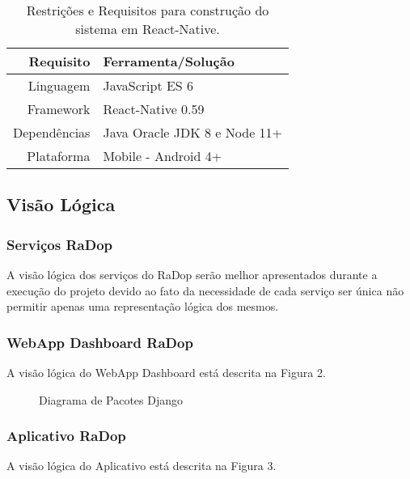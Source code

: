 \begin{table}[h]
\centering
  \begin{tabular}{|r|l|}
  \hline
  \textbf{Requisito} & \textbf{Ferramenta/Solução}  \\ \hline
  Linguagem          & JavaScript ES 6              \\ \hline
  Framework          & React-Native 0.59            \\ \hline
  Dependências       & Java Oracle JDK 8 e Node 11+ \\ \hline
  Plataforma         & Mobile - Android 4+          \\ \hline
  \end{tabular}
  \caption{Restrições e Requisitos para construção do sistema em React-Native.}
\end{table}

\subsection{Visão Lógica}\label{visao-logica}

\subsubsection{Serviços RaDop}\label{servicos-radop}

A visão lógica dos serviços do RaDop serão melhor apresentados durante a
execução do projeto devido ao fato da necessidade de cada serviço ser
única não permitir apenas uma representação lógica dos mesmos.

\subsubsection{WebApp Dashboard RaDop}\label{visao-webapp-dashboard-radop}

A visão lógica do WebApp Dashboard está descrita na Figura 2.

\begin{figure}[!htb]
    \caption{\label{fig:diagrama-pact-django} Diagrama de Pacotes Django}
\end{figure}

\subsubsection{Aplicativo RaDop}\label{visao-aplicativo-radop}

A visão lógica do Aplicativo está descrita na Figura 3.

